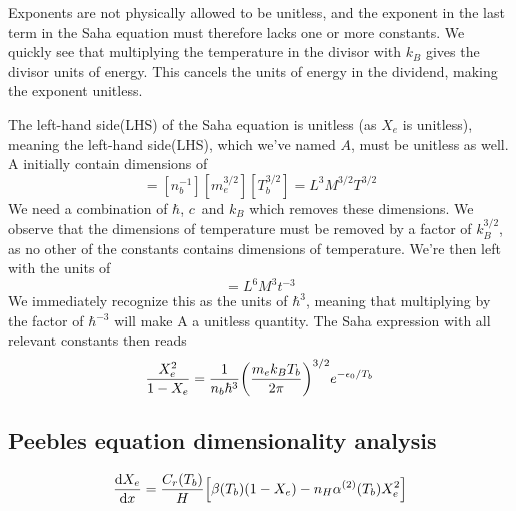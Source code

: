 \documentclass[10pt, a4paper]{article}
\begin{document}
Exponents are not physically allowed to be unitless, and the exponent in the last term in the Saha equation must therefore lacks one or more constants. We quickly see that multiplying the temperature in the divisor with $k_B$ gives the divisor units of energy. This cancels the units of energy in the dividend, making the exponent unitless.

The left-hand side(LHS) of the Saha equation is unitless (as $X_e$ is unitless), meaning the left-hand side(LHS), which we've named $A$, must be unitless as well. A initially contain dimensions of
\begin{equation*}
    [A] = [n_b^{-1}][m_e^{3/2}][T_b^{3/2}] = L^3M^{3/2}T^{3/2}
\end{equation*}
We need a combination of $\hbar$, $c$ and $k_B$ which removes these dimensions. We observe that the dimensions of temperature must be removed by a factor of $k_B^{3/2}$, as no other of the constants contains dimensions of temperature. We're then left with the units of
\begin{equation*}
    [A][k_B^{3/2}] = L^6M^3t^{-3}
\end{equation*}
We immediately recognize this as the units of $\hbar^3$, meaning that multiplying by the factor of $\hbar^{-3}$ will make A a unitless quantity. The Saha expression with all relevant constants then reads
\begin{equation}
    \frac{X_{e}^{2}}{1-X_{e}} = \frac{1}{n_{b}\hbar^3}\qty(\frac{m_{e} k_B T_{b}}{2 \pi})^{3 / 2} e^{-\epsilon_{0} / T_{b}}
\end{equation}


\subsection{Peebles equation dimensionality analysis}

\begin{equation}
    \label{eqn:Peebles}
    \dv{X_{e}}{x}=\frac{C_{r}\qty(T_{b})}{H}\qty[\beta\qty(T_{b})\qty(1-X_{e})-n_{H} \alpha^{(2)}\qty(T_{b}) X_{e}^{2}]
\end{equation}
\end{document}
